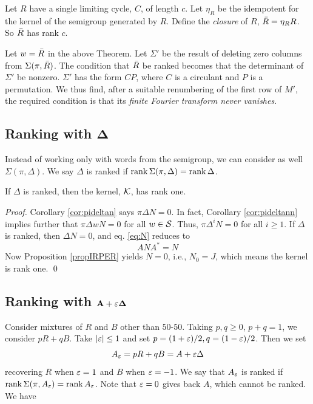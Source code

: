 Let $R$ have a single limiting cycle, $C$, of length $c$. Let $\eta_R$ be the idempotent for the kernel of the semigroup generated by $R$. Define the \textsl{closure\/} of $R$, ${\bar R}=\eta_RR$. So ${\bar R}$ has rank $c$.

Let $w={\bar R}$ in the above Theorem.
Let $\Sigma'$ be the result of deleting zero columns from $\Sigma(\pi,{\bar R})$.
The condition that ${\bar R}$ be ranked becomes that the determinant of $\Sigma'$ be nonzero. 
$\Sigma'$ has the form $CP$, where $C$ is a circulant and $P$ is a permutation. We thus find, after a suitable renumbering of the first row of $M'$, the required condition is 
that its {\it finite Fourier transform never vanishes\/}. 

\subsection{Ranking with $\boldsymbol\Delta$}
\label{sec:6.6.1}

Instead of working only with words from the semigroup, we can consider as well 
$ \Sigma(\pi,\Delta)$. We say $\Delta$ is ranked if ${\rm rank}\, \Sigma(\pi,\Delta)={\rm rank}\, \Delta$.

\begin{theorem} 	\label{thm:6.2}
If $\Delta$ is ranked, then the kernel, ${\mathcal K}$, has rank one. 
\end{theorem}

\begin{proof} 
Corollary \ref{cor:pideltan} says $\pi\Delta N=0$. In fact, Corollary \ref{cor:pideltann}
implies further that $\pi \Delta wN=0$ for all $w\in{\mathcal S}$. Thus,
$\pi\Delta^i N=0$ for all $i\ge1$. If $\Delta$ is ranked, then $\Delta N=0$, and eq. \eqref{eq:N} reduces to
$$ 
  ANA^*=N
$$
Now Proposition \ref{propIRPER} yields $N=0$, i.e., $N_0=J$, which means the kernel is rank one. \qed
\end{proof}

\subsection{Ranking with $\mathbf{A+\varepsilon\boldsymbol\Delta}$}
\label{sec:6.6.2}

Consider mixtures of $R$ and $B$ other than $50$-$50$. Taking $p,q\ge0$, $p+q=1$, we consider
$pR+qB$. Take $|\varepsilon|\le1$ and set $p=(1+\varepsilon)/2,q=(1-\varepsilon)/2$. Then we set
$$
  A_\varepsilon = pR+qB=A+\varepsilon\Delta
$$
recovering $R$ when $\varepsilon=1$ and $B$ when $\varepsilon=-1$.  We say that $A_\varepsilon$ is ranked if
${\rm rank}\, \Sigma(\pi,A_\varepsilon)={\rm rank}\, A_\varepsilon$. Note that $\varepsilon=0$ gives back $A$, which cannot be ranked.
We have
 
